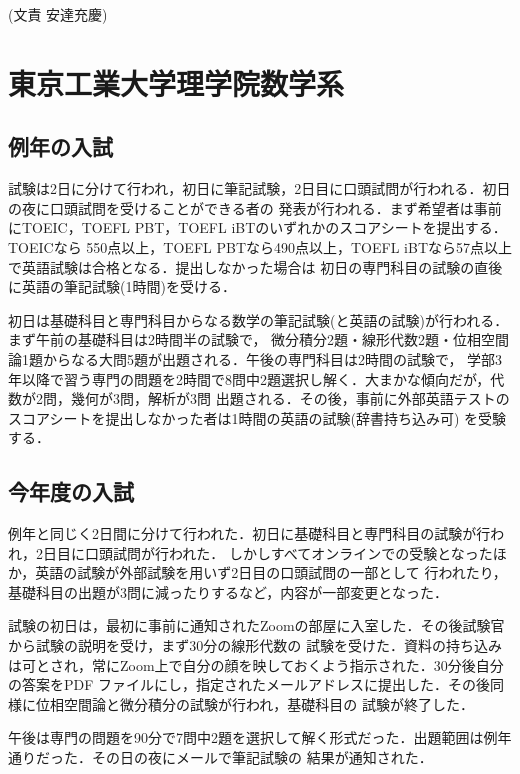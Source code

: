 \documentclass[uplatex]{jsarticle}
\begin{document}
\begin{flushright}
  (文責 安達充慶)
\end{flushright}

\newpage
\section*{東京工業大学理学院数学系}
\subsection*{例年の入試}
試験は2日に分けて行われ，初日に筆記試験，2日目に口頭試問が行われる．初日の夜に口頭試問を受けることができる者の
発表が行われる．まず希望者は事前にTOEIC，TOEFL PBT，TOEFL iBTのいずれかのスコアシートを提出する．TOEICなら
550点以上，TOEFL PBTなら490点以上，TOEFL iBTなら57点以上で英語試験は合格となる．提出しなかった場合は
初日の専門科目の試験の直後に英語の筆記試験(1時間)を受ける．

初日は基礎科目と専門科目からなる数学の筆記試験(と英語の試験)が行われる．まず午前の基礎科目は2時間半の試験で，
微分積分2題・線形代数2題・位相空間論1題からなる大問5題が出題される．午後の専門科目は2時間の試験で，
学部3年以降で習う専門の問題を2時間で8問中2題選択し解く．大まかな傾向だが，代数が2問，幾何が3問，解析が3問
出題される．その後，事前に外部英語テストのスコアシートを提出しなかった者は1時間の英語の試験(辞書持ち込み可)
を受験する．

\subsection*{今年度の入試}
例年と同じく2日間に分けて行われた．初日に基礎科目と専門科目の試験が行われ，2日目に口頭試問が行われた．
しかしすべてオンラインでの受験となったほか，英語の試験が外部試験を用いず2日目の口頭試問の一部として
行われたり，基礎科目の出題が3問に減ったりするなど，内容が一部変更となった．

試験の初日は，最初に事前に通知されたZoomの部屋に入室した．その後試験官から試験の説明を受け，まず30分の線形代数の
試験を受けた．資料の持ち込みは可とされ，常にZoom上で自分の顔を映しておくよう指示された．30分後自分の答案をPDF
ファイルにし，指定されたメールアドレスに提出した．その後同様に位相空間論と微分積分の試験が行われ，基礎科目の
試験が終了した．

午後は専門の問題を90分で7問中2題を選択して解く形式だった．出題範囲は例年通りだった．その日の夜にメールで筆記試験の
結果が通知された．
\end{document}
